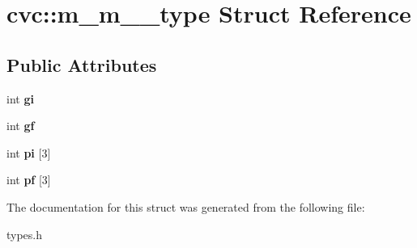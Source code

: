 \hypertarget{structcvc_1_1m__m__2pt__type}{\section{cvc\-:\-:m\-\_\-m\-\_\-2pt\-\_\-type Struct Reference}
\label{structcvc_1_1m__m__2pt__type}
}
\subsection*{Public Attributes}
\begin{DoxyCompactItemize}
\item 
\hypertarget{structcvc_1_1m__m__2pt__type_aa7375695d8302ea769af3d3212e6388e}{int {\bfseries gi}}\label{structcvc_1_1m__m__2pt__type_aa7375695d8302ea769af3d3212e6388e}

\item 
\hypertarget{structcvc_1_1m__m__2pt__type_ac8377dc22d85366a8cb471a3e0d2d1db}{int {\bfseries gf}}\label{structcvc_1_1m__m__2pt__type_ac8377dc22d85366a8cb471a3e0d2d1db}

\item 
\hypertarget{structcvc_1_1m__m__2pt__type_aff561389d4408313b822ae81d6f14bca}{int {\bfseries pi} \mbox{[}3\mbox{]}}\label{structcvc_1_1m__m__2pt__type_aff561389d4408313b822ae81d6f14bca}

\item 
\hypertarget{structcvc_1_1m__m__2pt__type_a5d3e499a5e8346ef87de993a3b3752f9}{int {\bfseries pf} \mbox{[}3\mbox{]}}\label{structcvc_1_1m__m__2pt__type_a5d3e499a5e8346ef87de993a3b3752f9}

\end{DoxyCompactItemize}


The documentation for this struct was generated from the following file\-:\begin{DoxyCompactItemize}
\item 
types.\-h\end{DoxyCompactItemize}

